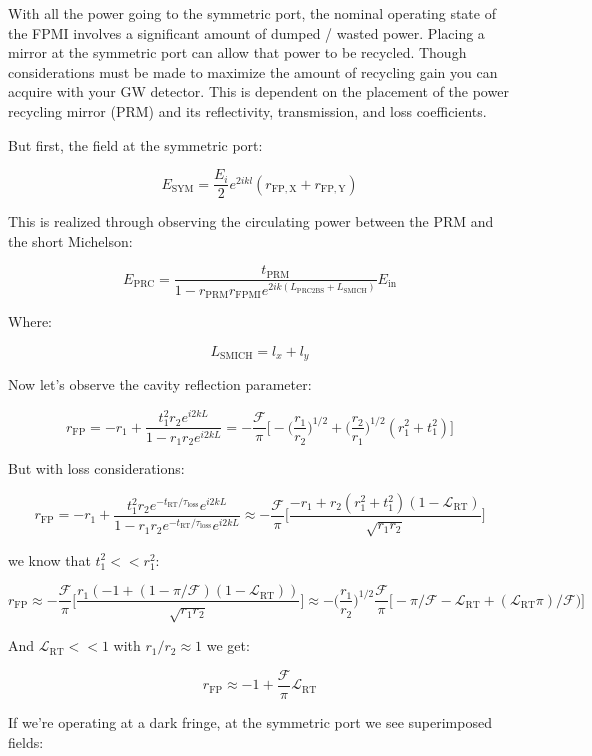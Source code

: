 \documentclass[11pt]{article}
\begin{document}
With all the power going to the symmetric port, the nominal operating
state of the FPMI involves a significant amount of dumped / wasted
power. Placing a mirror at the symmetric port can allow that power to be
recycled. Though considerations must be made to maximize the amount of
recycling gain you can acquire with your GW detector. This is dependent
on the placement of the power recycling mirror (PRM) and its
reflectivity, transmission, and loss coefficients.

But first, the field at the symmetric port:

\[E_\mathrm{SYM} = \frac{E_i}{2}e^{2ikl}(r_\mathrm{FP,X} + r_\mathrm{FP,Y}) \]

This is realized through observing the circulating power between the PRM
and the short Michelson:

\[ E_\mathrm{PRC} = \frac{t_\mathrm{PRM}}{1- r_\mathrm{PRM} r_\mathrm{FPMI} e^{2ik (L_\mathrm{PRC2BS} + L_\mathrm{SMICH})}}E_\mathrm{in} \]

Where:

\[ L_\mathrm{SMICH} = l_x + l_y \]

    Now let's observe the cavity reflection parameter:

\[ r_\mathrm{FP} = -r_1 + \frac{t_1^2 r_2 e^{i2kL}}{1-r_1 r_2 e^{i2kL}} = -\frac{\mathcal{F}}{\pi} \Big[-\Big(\frac{r_1}{r_2} \Big)^{1/2} + \Big(\frac{r_2}{r_1}\Big)^{1/2} (r_1^2 + t_1^2) \Big]\]

    But with loss considerations:

\[ r_\mathrm{FP} = -r_1 + \frac{t_1^2 r_2 e^{- t_\mathrm{RT}/\tau_\mathrm{loss}}  e^{i2kL}}{1-r_1 r_2 e^{- t_\mathrm{RT}/\tau_\mathrm{loss}} e^{i2kL}} \approx -\frac{\mathcal{F}}{\pi} \Big[\frac{-r_1 +  r_2(r_1^2 + t_1^2)(1-\mathscr{L}_\mathrm{RT})}{\sqrt{r_1 r_2}} \Big]\]

    we know that \(t_1^2 << r_1^2\):

\[r_\mathrm{FP} \approx -\frac{\mathcal{F}}{\pi} \Big[ \frac{r_1(-1 + (1 - \pi/\mathcal{F}) (1- \mathscr{L}_\mathrm{RT}))}{\sqrt{r_1 r_2}} \Big] \approx  -\Big(\frac{r_1}{r_2}\Big)^{1/2} \frac{\mathcal{F}}{\pi} \Big[- \pi/\mathcal{F} - \mathscr{L}_\mathrm{RT} + (\mathscr{L}_\mathrm{RT}\pi)/\mathcal{F}) \Big] \]

    And \(\mathscr{L}_\mathrm{RT} <<1\) with \(r_1 /r_2 \approx 1\) we get:

\[r_\mathrm{FP} \approx -1 + \frac{\mathcal{F}}{\pi} \mathscr{L}_\mathrm{RT}\]

    If we're operating at a dark fringe, at the symmetric port we see
superimposed fields:
\end{document}
